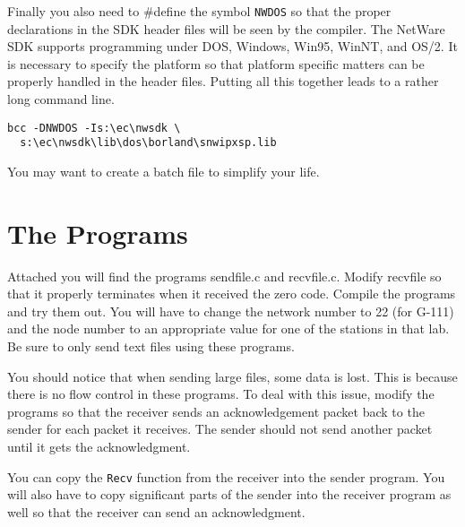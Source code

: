\documentclass{article}
\begin{document}
Finally you also need to \#define the symbol {\tt NWDOS} so that the
proper declarations in the SDK header files will be seen by the
compiler. The NetWare SDK supports programming under DOS, Windows,
Win95, WinNT, and OS/2. It is necessary to specify the platform so that
platform specific matters can be properly handled in the header files.
Putting all this together leads to a rather long command line.

\begin{verbatim}
bcc -DNWDOS -Is:\ec\nwsdk \
  s:\ec\nwsdk\lib\dos\borland\snwipxsp.lib
\end{verbatim}

You may want to create a batch file to simplify your life.

\section{The Programs}

Attached you will find the programs sendfile.c and recvfile.c. Modify
recvfile so that it properly terminates when it received the zero code.
Compile the programs and try them out. You will have to change the
network number to 22 (for G-111) and the node number to an appropriate
value for one of the stations in that lab. Be sure to only send text
files using these programs.

You should notice that when sending large files, some data is lost. This
is because there is no flow control in these programs. To deal with this
issue, modify the programs so that the receiver sends an acknowledgement
packet back to the sender for each packet it receives. The sender should
not send another packet until it gets the acknowledgment.

You can copy the {\tt Recv} function from the receiver into the sender
program. You will also have to copy significant parts of the sender into
the receiver program as well so that the receiver can send an
acknowledgment.
\end{document}
